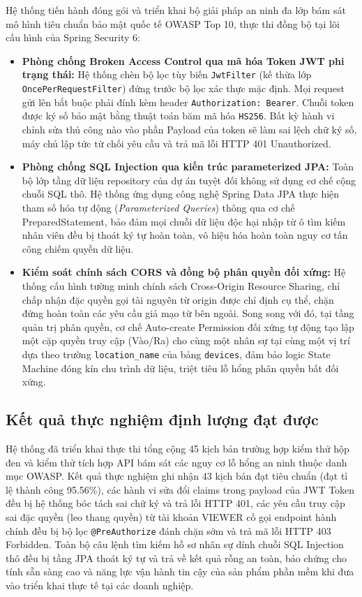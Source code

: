 ﻿\documentclass[../DoAn.tex]{subfiles}
\begin{document}
Hệ thống tiến hành đóng gói và triển khai bộ giải pháp an ninh đa lớp bám sát mô hình tiêu chuẩn bảo mật quốc tế OWASP Top 10, thực thi đồng bộ tại lõi cấu hình của Spring Security 6:
\begin{itemize}
    \item \textbf{Phòng chống Broken Access Control qua mã hóa Token JWT phi trạng thái:} Hệ thống chèn bộ lọc tùy biến \texttt{JwtFilter} (kế thừa lớp \texttt{OncePerRequestFilter}) đứng trước bộ lọc xác thực mặc định. Mọi request gửi lên bắt buộc phải đính kèm header \texttt{Authorization: Bearer}. Chuỗi token được ký số bảo mật bằng thuật toán băm mã hóa \texttt{HS256}. Bất kỳ hành vi chỉnh sửa thủ công nào vào phần Payload của token sẽ làm sai lệch chữ ký số, máy chủ lập tức từ chối yêu cầu và trả mã lỗi HTTP 401 Unauthorized.
    \item \textbf{Phòng chống SQL Injection qua kiến trúc parameterized JPA:} Toàn bộ lớp tầng dữ liệu repository của dự án tuyệt đối không sử dụng cơ chế cộng chuỗi SQL thô. Hệ thống ứng dụng công nghệ Spring Data JPA thực hiện tham số hóa tự động (\textit{Parameterized Queries}) thông qua cơ chế PreparedStatement, bảo đảm mọi chuỗi dữ liệu độc hại nhập từ ô tìm kiếm nhân viên đều bị thoát ký tự hoàn toàn, vô hiệu hóa hoàn toàn nguy cơ tấn công chiếm quyền dữ liệu.
    \item \textbf{Kiểm soát chính sách CORS và đồng bộ phân quyền đối xứng:} Hệ thống cấu hình tường minh chính sách Cross-Origin Resource Sharing, chỉ chấp nhận đặc quyền gọi tài nguyên từ origin được chỉ định cụ thể, chặn đứng hoàn toàn các yêu cầu giả mạo từ bên ngoài. Song song với đó, tại tầng quản trị phân quyền, cơ chế Auto-create Permission đối xứng tự động tạo lập một cặp quyền truy cập (Vào/Ra) cho cùng một nhân sự tại cùng một vị trí dựa theo trường \texttt{location\_name} của bảng \texttt{devices}, đảm bảo logic State Machine đóng kín chu trình dữ liệu, triệt tiêu lỗ hổng phân quyền bất đối xứng.
\end{itemize}

\subsection{Kết quả thực nghiệm định lượng đạt được}

Hệ thống đã triển khai thực thi tổng cộng 45 kịch bản trường hợp kiểm thử hộp đen và kiểm thử tích hợp API bám sát các nguy cơ lỗ hổng an ninh thuộc danh mục OWASP. Kết quả thực nghiệm ghi nhận 43 kịch bản đạt tiêu chuẩn (đạt tỉ lệ thành công 95.56\%), các hành vi sửa đổi claims trong payload của JWT Token đều bị hệ thống bóc tách sai chữ ký và trả lỗi HTTP 401, các yêu cầu truy cập sai đặc quyền (leo thang quyền) từ tài khoản VIEWER cố gọi endpoint hành chính đều bị bộ lọc \texttt{@PreAuthorize} đánh chặn sớm và trả mã lỗi HTTP 403 Forbidden. Toàn bộ câu lệnh tìm kiếm hồ sơ nhân sự dính chuỗi SQL Injection thô đều bị tầng JPA thoát ký tự và trả về kết quả rỗng an toàn, bảo chứng cho tính sẵn sàng cao và năng lực vận hành tin cậy của sản phẩm phần mềm khi đưa vào triển khai thực tế tại các doanh nghiệp.
\end{document}
